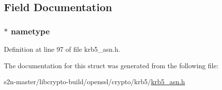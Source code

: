 \subsection{Field Documentation}
\subsubsection[{\texorpdfstring{nametype}{nametype}}]{ $\ast$ nametype}\hypertarget{structkrb5__princname__st_aa63f2e81a241cb2570a9fe3918a4817c}{}\label{structkrb5__princname__st_aa63f2e81a241cb2570a9fe3918a4817c}


Definition at line 97 of file krb5\+\_\+asn.\+h.



The documentation for this struct was generated from the following file\+:\begin{DoxyCompactItemize}
\item 
s2n-\/master/libcrypto-\/build/openssl/crypto/krb5/\hyperlink{crypto_2krb5_2krb5__asn_8h}{krb5\+\_\+asn.\+h}\end{DoxyCompactItemize}
